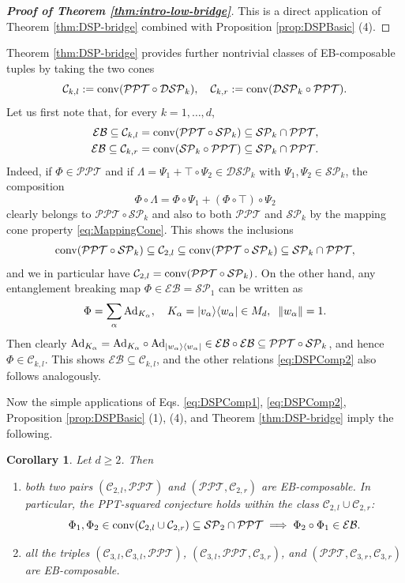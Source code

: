 \documentclass[11pt,reqno]{amsart}
\newtheorem{corollary}[theorem]{Corollary}
\theoremstyle{definition}
\theoremstyle{definition}
\theoremstyle{definition}
\theoremstyle{definition}
\newcommand{\la}{\langle}
\newcommand{\ra}{\rangle}
\newcommand{\SP}{\mathcal{SP}}
\newcommand{\DSP}{\mathcal{DSP}}
\newcommand{\EB}{\mathcal{EB}}
\newcommand{\PPT}{\mathcal{PPT}}
\newcommand{\Ad}{{\rm Ad}}
\begin{document}
\begin{proof} [\textbf{Proof of Theorem \ref{thm:intro-low-bridge}}]
This is a direct application of Theorem \ref{thm:DSP-bridge} combined with Proposition \ref{prop:DSPBasic} (4).
\end{proof}

Theorem \ref{thm:DSP-bridge} provides further nontrivial classes of EB-composable tuples by taking the two cones
    $$\mathcal{C}_{k,l}:={\rm conv}(\PPT\circ \DSP_k), \quad \mathcal{C}_{k,r}:={\rm conv}(\DSP_k\circ \PPT).$$
Let us first note that, for every $k=1,\ldots, d$,
\begin{align}
    \EB\subseteq \mathcal{C}_{k,l} &= {\rm conv}(\PPT\circ \SP_k)\subseteq \SP_k\cap \PPT, \label{eq:DSPComp1} \\
    \EB\subseteq\mathcal{C}_{k,r} &= {\rm conv}(\SP_k \circ \PPT)\subseteq \SP_k\cap \PPT. \label{eq:DSPComp2}
\end{align}
Indeed, if $\Phi\in \PPT$ and if $\Lambda = \Psi_1+ \top \circ \Psi_2\in \DSP_k$ with $\Psi_1,\Psi_2\in \SP_k$, the composition
    $$\Phi\circ \Lambda = \Phi \circ \Psi_1 + (\Phi\circ \top)\circ \Psi_2$$
clearly belongs to $\PPT \circ \SP_k$ and also to both $\PPT$ and $\SP_k$ by the mapping cone property \eqref{eq:MappingCone}. This shows the inclusions 
    $${\rm conv}(\PPT\circ \SP_k) \subseteq \mathcal{C}_{2,l} \subseteq {\rm conv}(\PPT\circ \SP_k) \subseteq \SP_k\cap \PPT,$$
and we in particular have $\mathcal{C}_{2,l} = {\rm conv}(\PPT\circ \SP_k)$. On the other hand, any entanglement breaking map $\Phi\in \EB = \SP_1$ can be written as 
    $$\Phi = \sum_{\alpha}\Ad_{K_{\alpha}}, \quad K_{\alpha} = |v_{\alpha}\ra\la w_{\alpha}|\in M_d,\;\; \|w_{\alpha}\|=1.$$
Then clearly $\Ad_{K_{\alpha}} = \Ad_{K_{\alpha}}\circ \Ad_{|w_{\alpha}\ra\la w_{\alpha}|}\in \EB\circ \EB \subseteq \PPT \circ \SP_k$, and hence $\Phi\in \mathcal{C}_{k,l}$. This shows $\EB\subseteq \mathcal{C}_{k,l}$, and the other relations \eqref{eq:DSPComp2} also follows analogously.

Now the simple applications of Eqs. \eqref{eq:DSPComp1}, \eqref{eq:DSPComp2}, Proposition \ref{prop:DSPBasic} (1), (4), and Theorem \ref{thm:DSP-bridge} imply the following.

\begin{corollary} \label{cor:EBComp}
Let $d\geq 2$. Then
\begin{enumerate}
    \item both two pairs $(\mathcal{C}_{2,l},\PPT)$ and $(\PPT, \mathcal{C}_{2,r})$ are EB-composable. In particular, the PPT-squared conjecture holds within the class $\mathcal{C}_{2,l}\cup \mathcal{C}_{2,r}$:
        $$\Phi_1,\Phi_2\in {\rm conv}(\mathcal{C}_{2,l}\cup \mathcal{C}_{2,r})\subseteq \SP_2\cap \PPT \implies \Phi_2 \circ \Phi_1\in \EB.$$

    \item all the triples $(\mathcal{C}_{3,l}, \mathcal{C}_{3,l}, \PPT)$, $(\mathcal{C}_{3,l}, \PPT, \mathcal{C}_{3,r})$, and $(\PPT, \mathcal{C}_{3,r},\mathcal{C}_{3,r})$
    are EB-composable.
\end{enumerate}
\end{corollary}
\end{document}
